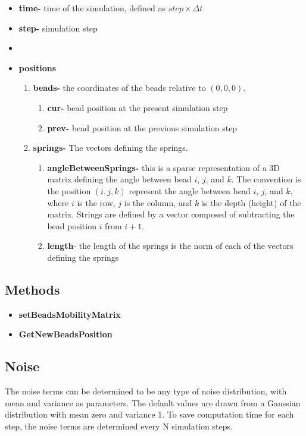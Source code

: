 \documentclass[12pt]{report}
\begin{document}
\begin{itemize}
\item{\textbf{time-}} time of the simulation, defined as $step\times\Delta t$
\item{\textbf{step-}} simulation step
\item{\textbf{}}
\item{\textbf{positions}}
\begin{enumerate}
\item{\textbf{beads-}} the coordinates of the beads relative to $(0,0,0)$.
\begin{enumerate}
\item{\textbf{cur-}} bead position at the present simulation step 
\item{\textbf{prev-}} bead position at the previous simulation step
\end{enumerate}
\item{\textbf{springs-}} The vectors defining the springs.
\begin{enumerate}
\item{\textbf{angleBetweenSprings-}} this is a sparse representation of a 3D matrix defining the angle between bead $i$, $j$, and $k$. The convention is the position $(i,j,k)$ represent the angle between bead $i$, $j$, and $k$, where $i$ is the row, $j$ is the column, and $k$ is the depth (height) of the matrix. Strings are defined by a vector composed of subtracting the bead position $i$ from $i+1$.
\item{\textbf{length}}- the length of the springs is the norm of each of the vectors defining the springs
\end{enumerate}


\end{enumerate}
\end{itemize}

\subsection{Methods}
\begin{itemize}
\item{\textbf{setBeadsMobilityMatrix}}
\item{\textbf{GetNewBeadsPosition}}
\end{itemize}

\subsection{Noise} 
The noise terms can be determined to be any type of noise distribution, with mean and variance as parameters. The default values are drawn from a Gaussian distribution with mean zero and variance 1. 
To save computation time for each step, the noise terms are determined every N simulation steps. 
\end{document}
